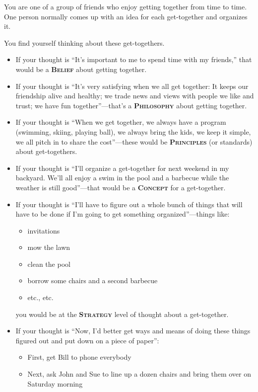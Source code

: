 \documentclass[a5paper]{article}
\begin{document}
You are one of a group of friends who enjoy getting together from time to time.
One person normally comes up with an idea for each get-together and organizes it.

You find yourself thinking about these get-togethers.
\begin{itemize}
  \item If your thought is ``It's important to me to spend time with my friends,'' that would be a \textbf{\scshape Belief} about getting together.
  \item If your thought is ``It's very satisfying when we all get together: It keeps our friendship alive and healthy; we trade news and views with people we like and trust; we have fun together''---that's a \textbf{\scshape Philosophy} about getting together.
  \item If your thought is ``When we get together, we always have a program (swimming, skiing, playing ball), we always bring the kids, we keep it simple, we all pitch in to share the cost''---these would be \textbf{\scshape Principles} (or standards) about get-togethers.
  \item If your thought is ``I'll organize a get-together for next weekend in my backyard.
    We'll all enjoy a swim in the pool and a barbecue while the weather is still good''---that would be a \textbf{\scshape Concept} for a get-together.
  \item If your thought is ``I'll have to figure out a whole bunch of things that will have to be done if I'm going to get something organized''---things like:
    \begin{itemize}
      \item invitations
      \item mow the lawn
      \item clean the pool
      \item borrow some chairs and a second barbecue
      \item etc., etc.
    \end{itemize}
    you would be at the \textbf{\scshape Strategy} level of thought about a get-together.
  \item If your thought is ``Now, I'd better get ways and means of doing these things figured out and put down on a piece of paper'':
    \begin{itemize}
      \item First, get Bill to phone everybody
      \item Next, ask John and Sue to line up a dozen chairs and bring them over on Saturday morning

\end{itemize}
\end{itemize}
\end{document}
